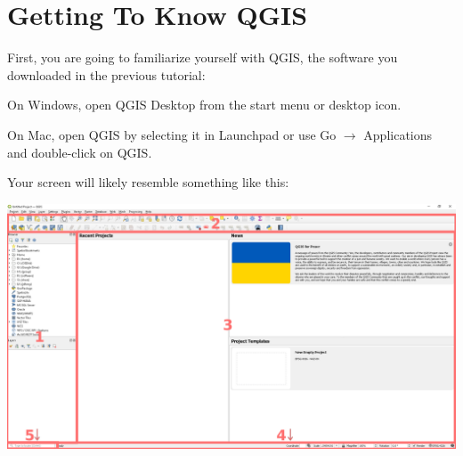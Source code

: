 \documentclass[oneside,a4paper,11pt,explicit]{book}
\begin{document}
\section{Getting To Know QGIS}

First, you are going to familiarize yourself with QGIS, the software you downloaded in the previous tutorial:

On Windows, open QGIS Desktop from the start menu or desktop icon. 

On Mac, open QGIS by selecting it in Launchpad or use Go $\rightarrow$ Applications and double-click on QGIS.

Your screen will likely resemble something like this:

\centerline{\includegraphics[width=\textwidth]{QGISscreen.png}}
\end{document}
